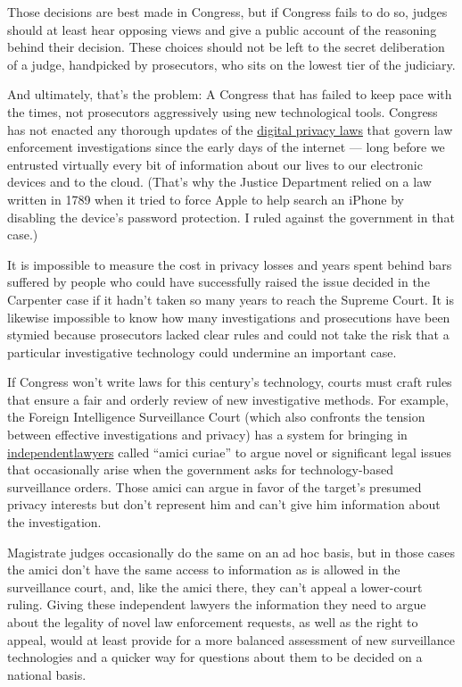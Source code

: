 Those decisions are best made in Congress, but if Congress fails to do
so, judges should at least hear opposing views and give a public account
of the reasoning behind their decision. These choices should not be left
to the secret deliberation of a judge, handpicked by prosecutors, who
sits on the lowest tier of the judiciary.

And ultimately, that's the problem: A Congress that has failed to keep
pace with the times, not prosecutors aggressively using new
technological tools. Congress has not enacted any thorough updates of
the
\href{https://www.brookings.edu/blog/techtank/2019/01/07/will-this-new-congress-be-the-one-to-pass-data-privacy-legislation/}{digital
privacy laws} that govern law enforcement investigations since the early
days of the internet --- long before we entrusted virtually every bit of
information about our lives to our electronic devices and to the cloud.
(That's why the Justice Department relied on a law written in 1789 when
it tried to force Apple to help search an iPhone by disabling the
device's password protection. I ruled against the government in that
case.)

It is impossible to measure the cost in privacy losses and years spent
behind bars suffered by people who could have successfully raised the
issue decided in the Carpenter case if it hadn't taken so many years to
reach the Supreme Court. It is likewise impossible to know how many
investigations and prosecutions have been stymied because prosecutors
lacked clear rules and could not take the risk that a particular
investigative technology could undermine an important case.

If Congress won't write laws for this century's technology, courts must
craft rules that ensure a fair and orderly review of new investigative
methods. For example, the Foreign Intelligence Surveillance Court (which
also confronts the tension between effective investigations and privacy)
has a system for bringing in
\href{https://www.lawfareblog.com/amici-curiae-fisc-announced}{independent}\href{https://www.lawfareblog.com/amici-curiae-fisc-announced}{lawyers}
called ``amici curiae'' to argue novel or significant legal issues that
occasionally arise when the government asks for technology-based
surveillance orders. Those amici can argue in favor of the target's
presumed privacy interests but don't represent him and can't give him
information about the investigation.

Magistrate judges occasionally do the same on an ad hoc basis, but in
those cases the amici don't have the same access to information as is
allowed in the surveillance court, and, like the amici there, they can't
appeal a lower-court ruling. Giving these independent lawyers the
information they need to argue about the legality of novel law
enforcement requests, as well as the right to appeal, would at least
provide for a more balanced assessment of new surveillance technologies
and a quicker way for questions about them to be decided on a national
basis.

